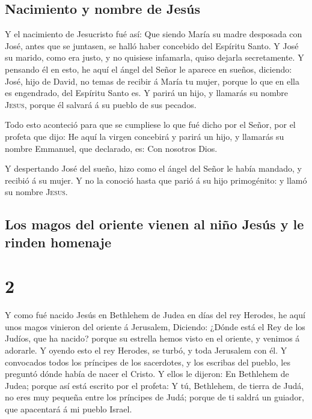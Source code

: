 \hypertarget{nacimiento-y-nombre-de-jesuxfas}{%
\subsection{Nacimiento y nombre de
Jesús}\label{nacimiento-y-nombre-de-jesuxfas}}

 Y el nacimiento de Jesucristo fué así: Que siendo María
su madre desposada con José, antes que se juntasen, se halló haber
concebido del Espíritu Santo.  Y José su marido, como era
justo, y no quisiese infamarla, quiso dejarla secretamente.
 Y pensando él en esto, he aquí el ángel del Señor le
aparece en sueños, diciendo: José, hijo de David, no temas de recibir á
María tu mujer, porque lo que en ella es engendrado, del Espíritu Santo
es.  Y parirá un hijo, y llamarás su nombre
\textsc{Jesus}, porque él salvará á su pueblo de sus pecados.

 Todo esto aconteció para que se cumpliese lo que fué
dicho por el Señor, por el profeta que dijo:  He aquí la
virgen concebirá y parirá un hijo, y llamarás su nombre Emmanuel, que
declarado, es: Con nosotros Dios.

 Y despertando José del sueño, hizo como el ángel del
Señor le había mandado, y recibió á su mujer.  Y no la
conoció hasta que parió á su hijo primogénito: y llamó su nombre
\textsc{Jesus}.

\hypertarget{los-magos-del-oriente-vienen-al-niuxf1o-jesuxfas-y-le-rinden-homenaje}{%
\subsection{Los magos del oriente vienen al niño Jesús y le rinden
homenaje}\label{los-magos-del-oriente-vienen-al-niuxf1o-jesuxfas-y-le-rinden-homenaje}}

\hypertarget{section-40-2}{%
\section{2}\label{section-40-2}}

 Y como fué nacido Jesús en Bethlehem de Judea en días del
rey Herodes, he aquí unos magos vinieron del oriente á Jerusalem,
 Diciendo: ¿Dónde está el Rey de los Judíos, que ha
nacido? porque su estrella hemos visto en el oriente, y venimos á
adorarle.  Y oyendo esto el rey Herodes, se turbó, y toda
Jerusalem con él.  Y convocados todos los príncipes de los
sacerdotes, y los escribas del pueblo, les preguntó dónde había de nacer
el Cristo.  Y ellos le dijeron: En Bethlehem de Judea;
porque así está escrito por el profeta:  Y tú, Bethlehem,
de tierra de Judá, no eres muy pequeña entre los príncipes de Judá;
porque de ti saldrá un guiador, que apacentará á mi pueblo Israel.

